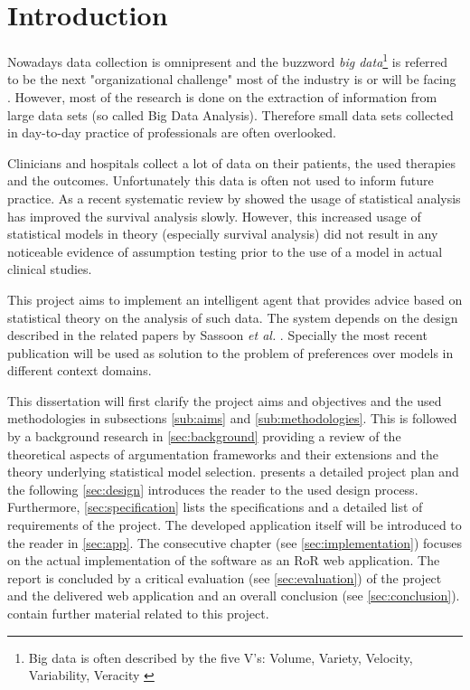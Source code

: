 \section{Introduction}

Nowadays data collection is omnipresent and the buzzword \textit{big data}\footnote{Big data is often described by the five V's: Volume, Variety, Velocity, Variability, Veracity \cite{Hilbert2015}} is referred to be the next "organizational challenge" most of the industry is or will be facing \cite{bigdata}. However, most of the research is done on the extraction of information from large data sets (so called Big Data Analysis). Therefore small data sets collected in day-to-day practice of professionals are often overlooked. 

Clinicians and hospitals collect a lot of data on their patients, the used therapies and the outcomes. Unfortunately this data is often not used to inform future practice. As a recent systematic review by \cite{survivalAnalysis} showed the usage of statistical analysis has improved the survival analysis slowly. However, this increased usage of statistical models in theory (especially survival analysis) did not result in any noticeable evidence of assumption testing prior to the use of a model in actual clinical studies.

This project aims to implement an intelligent agent that provides advice based on statistical theory on the analysis of such data. The system depends on the design described in the related papers by Sassoon \textit{et al.} \cite{sassoon2016,sassoon2014,sassoon2016CD}. Specially the most recent publication will be used as solution to the problem of preferences over models in different context domains. 


This dissertation will first clarify the project aims and objectives and the used methodologies in subsections \ref{sub:aims} and \ref{sub:methodologies}. This is followed by a background research in \autoref{sec:background} providing a review of the theoretical aspects of argumentation frameworks and their extensions and the theory underlying statistical model selection. 
 presents a detailed project plan and the following \autoref{sec:design} introduces the reader to the used design process. Furthermore, \autoref{sec:specification} lists the specifications and a detailed list of requirements of the project. The developed application itself will be introduced to the reader in \autoref{sec:app}. The consecutive chapter (see \autoref{sec:implementation}) focuses on the actual implementation of the software as an \gls{RoR} web application. 
The report is concluded by a critical evaluation (see \autoref{sec:evaluation}) of the project and the delivered web application and an overall conclusion (see \autoref{sec:conclusion}).
 contain further material related to this project.


